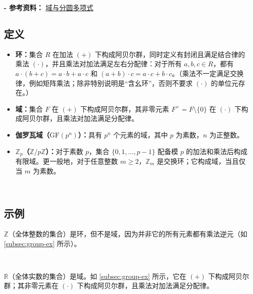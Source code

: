 \textbf{- 参考资料：}
\href{https://e.math.cornell.edu/people/belk/numbertheory/CyclotomicPolynomials.pdf}{域与分圆多项式}~\cite{cyclotomic-polynomial}

\subsection{定义}
\label{subsec:field-def}

\begin{tcolorbox}[title={\textbf{\tboxdef{\ref*{subsec:field-def}} 域的定义}}]
\begin{itemize}
\item \textbf{环：}集合 $R$ 在加法 $(+)$ 下构成阿贝尔群，同时定义有封闭且满足结合律的乘法 $(\cdot)$，并且乘法对加法满足左右分配律：对于所有 $a,b,c\in R$，都有 $a\cdot(b+c)=a\cdot b+a\cdot c$ 和 $(a+b)\cdot c=a\cdot c+b\cdot c$。（乘法不一定满足交换律，例如矩阵乘法；除非特别说明是“含幺环”，否则不要求 $(\cdot)$ 的单位元存在。）
\item \textbf{域：}集合 $F$ 在 $(+)$ 下构成阿贝尔群，其非零元素 $F^\times=F\setminus\{0\}$ 在 $(\cdot)$ 下构成阿贝尔群，且乘法对加法满足分配律。
\item \textbf{伽罗瓦域（$\mathrm{GF}(p^n)$）：}具有 $p^n$ 个元素的域，其中 $p$ 为素数，$n$ 为正整数。
\item \textbf{$\mathbb{Z}_p$（$\mathbb{Z}/p\mathbb{Z}$）：}对于素数 $p$，集合 $\{0,1,\ldots,p-1\}$ 配备模 $p$ 的加法和乘法后构成有限域。更一般地，对于任意整数 $m\ge 2$，$\mathbb{Z}_m$ 是交换环；它构成域，当且仅当 $m$ 为素数。\end{itemize}
\end{tcolorbox}

$ $

\subsection{示例}
\label{subsec:field-ex}

$\mathbb{Z}$（全体整数的集合）是环，但不是域，因为并非它的所有元素都有乘法逆元（如 \autoref{subsec:group-ex} 所示）。

$ $

\noindent $\mathbb{R}$（全体实数的集合）是域。如 \autoref{subsec:group-ex} 所示，它在 $(+)$ 下构成阿贝尔群；其非零元素在 $(\cdot)$ 下构成阿贝尔群，且乘法对加法满足分配律。

$ $

